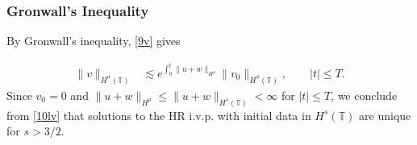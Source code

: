 \documentclass{beamer}
\newcommand{\ci}{\mathbb{T}}
\begin{document}
%
%
%
%
\begin{frame}
	\frametitle{Gronwall's Inequality}
By Gronwall's inequality, \eqref{9v} gives

%
%
\begin{equation}
\label{10lv}
\begin{split}
\|v\|_{H^\sigma(\ci)}
& \lesssim e^{\int_0^t \|u+w\|_{H^{\rho}}}
\|v_0\|_{H^\sigma(\ci)}, \qquad |t| \le T.
\end{split}
\end{equation}
%
%
Since $v_0 = 0$ and $\|u + w \|_{H^\rho}
\le \|u + w \|_{H^s(\ci)} < \infty$ for $|t| \le T$, we conclude from 
\eqref{10lv} that solutions to the HR i.v.p. with initial data in
$H^s(\ci)$ are unique for $s > 3/2$.  
%
%
\end{frame}
%
%
%
\end{document}
